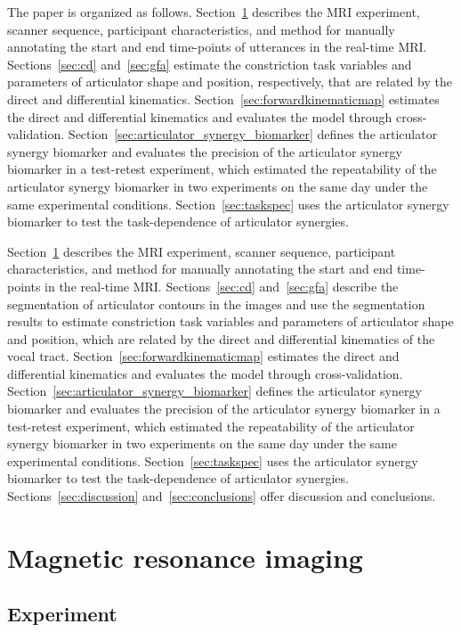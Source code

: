 \documentclass[reprint]{JASAnew}\usepackage[]{graphicx}\usepackage[]{color}
\begin{document}
The paper is organized as follows.
%
Section~\ref{sec:mri} describes the MRI experiment, scanner sequence, participant characteristics, and method for manually annotating the start and end time-points of utterances in the real-time MRI.
%
Sections~\ref{sec:cd} and~\ref{sec:gfa} estimate the constriction task variables and parameters of articulator shape and position, respectively, that are related by the direct and differential kinematics. 
% 
Section~\ref{sec:forwardkinematicmap} estimates the direct and differential kinematics and evaluates the model through cross-validation. 
%
Section~\ref{sec:articulator_synergy_biomarker} defines the articulator synergy biomarker and evaluates the precision of the articulator synergy biomarker in a test-retest experiment, which estimated the repeatability of the articulator synergy biomarker in two experiments on the same day under the same experimental conditions. 
% 
Section~\ref{sec:taskspec} uses the articulator synergy biomarker to test the task-dependence of articulator synergies. 

Section~\ref{sec:mri} describes the MRI experiment, scanner sequence, participant characteristics, and method for manually annotating the start and end time-points in the real-time MRI. 
Sections~\ref{sec:cd} and~\ref{sec:gfa} describe the segmentation of articulator contours in the images and use the segmentation results to estimate constriction task variables and parameters of articulator shape and position, which are related by the direct and differential kinematics of the vocal tract. 
Section~\ref{sec:forwardkinematicmap} estimates the direct and differential kinematics and evaluates the model through cross-validation. 
Section~\ref{sec:articulator_synergy_biomarker} defines the articulator synergy biomarker and evaluates the precision of the articulator synergy biomarker in a test-retest experiment, which estimated the repeatability of the articulator synergy biomarker in two experiments on the same day under the same experimental conditions. 
Section~\ref{sec:taskspec} uses the articulator synergy biomarker to test the task-dependence of articulator synergies. 
Sections~\ref{sec:discussion} and~\ref{sec:conclusions} offer discussion and conclusions.



\section{Magnetic resonance imaging}
\label{sec:mri}

\subsection{Experiment}
\end{document}

